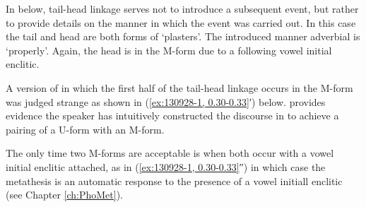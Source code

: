 In  below,
tail-head linkage serves not to introduce a subsequent event,
but rather to provide details on the manner in which the event was carried out.
In this case the tail and head are both forms of  `plasters'.
The introduced manner adverbial is  `properly'.
Again, the head is in the M-form due to a following vowel initial enclitic.


\begin{exe}
	\label{ex:130928-1, 0.30-0.33}
	\begin{xlist}
	\end{xlist}
\end{exe}

A version of  in which
the first half of the tail-head linkage occurs
in the M-form was judged strange
as shown in (\ref{ex:130928-1, 0.30-0.33}′) below.
provides evidence the speaker has intuitively constructed
the discourse in  to achieve a pairing
of a U-form with an M-form.

The only time two M-forms are acceptable is when
both occur with a vowel initial enclitic attached,
as in (\ref{ex:130928-1, 0.30-0.33}′′) in which case
the metathesis is an automatic response to the 
presence of a vowel initiall enclitic (see Chapter \ref{ch:PhoMet}).

